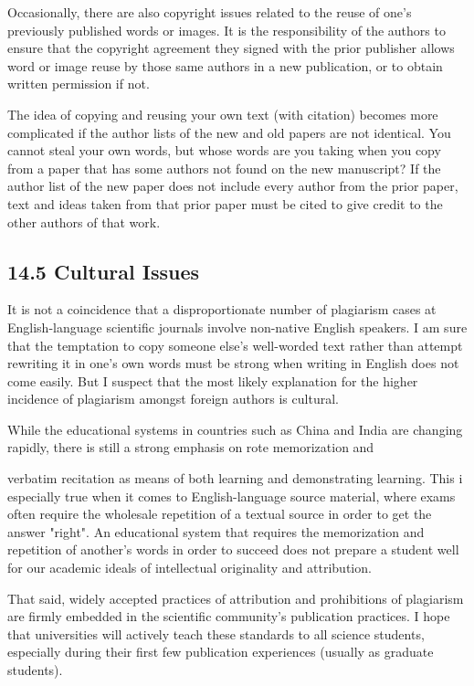Occasionally, there are also copyright issues related to the reuse of one's previously published words or images. It is the responsibility of the authors to ensure that the copyright agreement they signed with the prior publisher allows word or image reuse by those same authors in a new publication, or to obtain written permission if not.

The idea of copying and reusing your own text (with citation) becomes more complicated if the author lists of the new and old papers are not identical. You cannot steal your own words, but whose words are you taking when you copy from a paper that has some authors not found on the new manuscript? If the author list of the new paper does not include every author from the prior paper, text and ideas taken from that prior paper must be cited to give credit to the other authors of that work.

\subsection*{14.5 Cultural Issues}
It is not a coincidence that a disproportionate number of plagiarism cases at English-language scientific journals involve non-native English speakers. I am sure that the temptation to copy someone else's well-worded text rather than attempt rewriting it in one's own words must be strong when writing in English does not come easily. But I suspect that the most likely explanation for the higher incidence of plagiarism amongst foreign authors is cultural.

While the educational systems in countries such as China and India are changing rapidly, there is still a strong emphasis on rote memorization and

verbatim recitation as means of both learning and demonstrating learning. This i especially true when it comes to English-language source material, where exams often require the wholesale repetition of a textual source in order to get the answer "right". An educational system that requires the memorization and repetition of another's words in order to succeed does not prepare a student well for our academic ideals of intellectual originality and attribution.

That said, widely accepted practices of attribution and prohibitions of plagiarism are firmly embedded in the scientific community's publication practices. I hope that universities will actively teach these standards to all science students, especially during their first few publication experiences (usually as graduate students).

